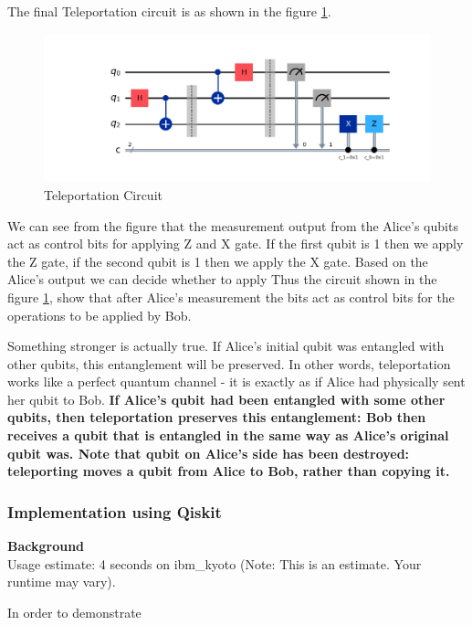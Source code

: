 \documentclass[12pt, oneside]{book}
\theoremstyle{definition}
\theoremstyle{definition}
\theoremstyle{remark}
\begin{document}
The final Teleportation circuit is as shown in the figure \ref{fig:teleportation}.
\begin{figure}
    \centering
    \includegraphics[width=1\textwidth]{../images/teleportation.png}
    \caption{Teleportation Circuit}
    \label{fig:teleportation}
\end{figure}
We can see from the figure that the measurement output from the Alice's qubits act as control bits for applying Z and X gate.
If the first qubit is 1 then we apply the Z gate, if the second qubit is 1 then we apply the X gate. Based on the Alice's output we can decide whether to apply  Thus the circuit shown in the figure \ref{fig:teleportation}, show that
after Alice's measurement the bits act as control bits for the operations to be applied by Bob.


Something stronger is actually true. If Alice's initial qubit was entangled with other qubits, this entanglement will be preserved. In other words, teleportation works like a perfect quantum channel - it is exactly as if Alice had physically sent her qubit to Bob. \textbf{If Alice's qubit had been entangled with some other qubits, then teleportation preserves this entanglement: Bob then receives a qubit that is entangled in the same way as Alice's original qubit was. Note that qubit on Alice's side has been destroyed: teleporting moves a qubit from Alice to Bob, rather than copying it. }

\subsubsection{Implementation using Qiskit}
\textbf{Background}\\
Usage estimate: 4 seconds on ibm\_kyoto (Note: This is an estimate. Your runtime may vary).

In order to demonstrate 
\end{document}
